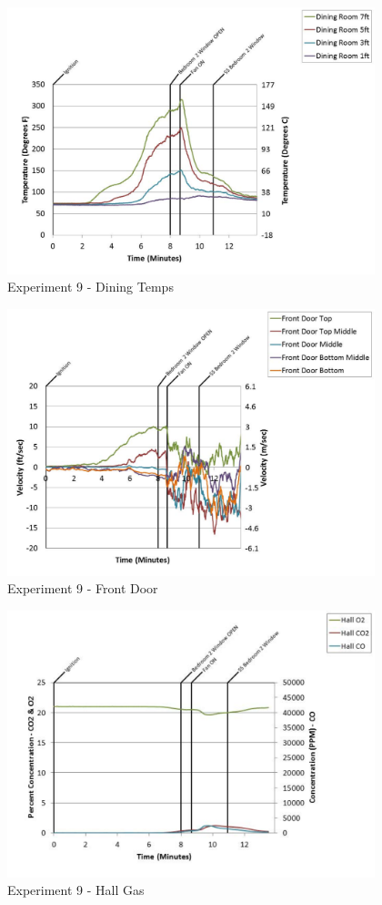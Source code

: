 \documentclass{article}
\begin{document}
\begin{appendices}
	\clearpage

	\begin{figure}[h!]
		\centering
		\includegraphics[height=3.05in]{0_Images/Results_Charts/Exp_9_Charts/DiningTemps.pdf}
		\caption{Experiment 9 - Dining Temps}
	\end{figure}
 

	\begin{figure}[h!]
		\centering
		\includegraphics[height=3.05in]{0_Images/Results_Charts/Exp_9_Charts/FrontDoor.pdf}
		\caption{Experiment 9 - Front Door}
	\end{figure}
 
	\clearpage

	\begin{figure}[h!]
		\centering
		\includegraphics[height=3.05in]{0_Images/Results_Charts/Exp_9_Charts/HallGas.pdf}
		\caption{Experiment 9 - Hall Gas}
	\end{figure}
 


\end{appendices}
\end{document}
